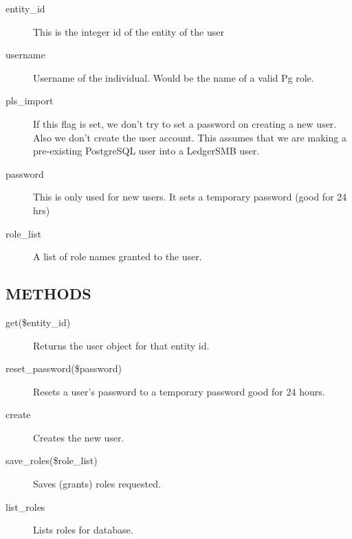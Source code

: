 \begin{description}
\begin{description}
\begin{description}
\begin{description}
\begin{description}
\begin{description}
\begin{description}
\begin{description}
\begin{description}
\item[{entity\_id}] \mbox{}

This is the integer id of the entity of the user


\item[{username}] \mbox{}

Username of the individual.  Would be the name of a valid Pg role.


\item[{pls\_import}] \mbox{}

If this flag is set, we don't try to set a password on creating a new user. Also
we don't create the user account.  This assumes that we are making a
pre-existing PostgreSQL user into a LedgerSMB user.


\item[{password}] \mbox{}

This is only used for new users. It sets a temporary password (good for 24 hrs)


\item[{role\_list}] \mbox{}

A list of role names granted to the user.

\end{description}
\subsection*{METHODS\label{LedgerSMB::DBObject::Entity::User_METHODS}}
\begin{description}

\item[{get(\$entity\_id)}] \mbox{}

Returns the user object for that entity id.


\item[{reset\_password(\$password)}] \mbox{}

Resets a user's password to a temporary password good for 24 hours.


\item[{create}] \mbox{}

Creates the new user.


\item[{save\_roles(\$role\_list)}] \mbox{}

Saves (grants) roles requested.


\item[{list\_roles}] \mbox{}

Lists roles for database.


\end{description}
\end{description}
\end{description}
\end{description}
\end{description}
\end{description}
\end{description}
\end{description}
\end{description}
